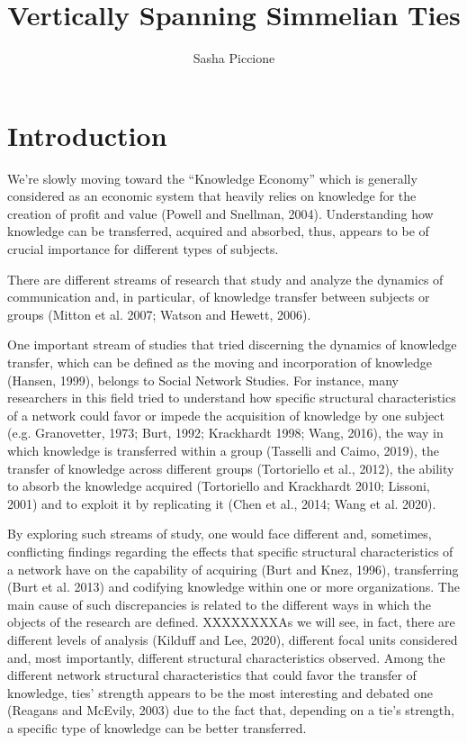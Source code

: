 \documentclass{article}
\title{Vertically Spanning Simmelian Ties}
\author{Sasha Piccione}
\begin{document}
\maketitle
\tableofcontents
{}




\newpage
\section{Introduction}
\bigskip
We’re slowly moving toward the “Knowledge Economy” which is generally considered as an economic system that heavily relies on knowledge for the creation of profit and value (Powell and Snellman, 2004). Understanding how knowledge can be transferred, acquired and absorbed, thus, appears to be of crucial importance for different types of subjects.

There are different streams of research that study and analyze the dynamics of communication and, in particular, of knowledge transfer between subjects or groups (Mitton et al. 2007; Watson and Hewett, 2006).

One important stream of studies that tried discerning the dynamics of knowledge transfer, which can be defined as the moving and incorporation of knowledge (Hansen, 1999), belongs to Social Network Studies. For instance, many researchers in this field tried to understand how specific structural characteristics of a network could favor or impede the acquisition of knowledge by one subject (e.g. Granovetter, 1973; Burt, 1992; Krackhardt 1998; Wang, 2016), the way in which knowledge is transferred within a group (Tasselli and Caimo, 2019), the transfer of knowledge across different groups (Tortoriello et al., 2012), the ability to absorb the knowledge acquired (Tortoriello and Krackhardt 2010; Lissoni, 2001) and to exploit it by replicating it (Chen et al., 2014; Wang et al. 2020). 

By exploring such streams of study, one would face different and, sometimes, conflicting findings regarding the effects that specific structural characteristics of a network have on the capability of acquiring (Burt and Knez, 1996), transferring (Burt et al. 2013) and codifying knowledge within one or more organizations. The main cause of such discrepancies is related to the different ways in which the objects of the research are defined. XXXXXXXXAs we will see, in fact, there are different levels of analysis (Kilduff and Lee, 2020), different focal units considered and, most importantly, different structural characteristics observed. Among the different network structural characteristics that could favor the transfer of knowledge, ties’ strength appears to be the most interesting and debated one (Reagans and McEvily, 2003) due to the fact that, depending on a tie’s strength, a specific type of knowledge can be better transferred. 
\end{document}
